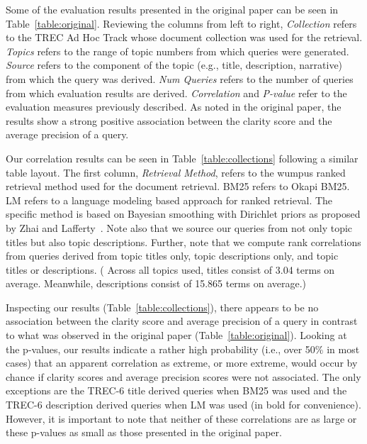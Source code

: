 \documentclass[format=sigconf, screen=true, review=false]{acmart}
\begin{document}
Some of the evaluation results presented in the original paper can be seen in Table~\ref{table:original}.
Reviewing the columns from left to right,
\textit{Collection} refers to the TREC Ad Hoc Track whose document collection was used for the retrieval.
\textit{Topics} refers to the range of topic numbers from which queries were generated.
\textit{Source} refers to the component of the topic (e.g., title, description, narrative) from which the query was derived.
\textit{Num Queries} refers to the number of queries from which evaluation results are derived.
\textit{Correlation} and \textit{P-value} refer to the evaluation measures previously described.
As noted in the original paper, the results show a strong positive association between the clarity score and the average precision of a query.



Our correlation results can be seen in Table~\ref{table:collections} following a similar table layout.
The first column, \textit{Retrieval Method}, refers to the wumpus ranked retrieval method used for the document retrieval.
BM25 refers to Okapi BM25.
LM refers to a language modeling based approach for ranked retrieval.
The specific method is based on Bayesian smoothing with Dirichlet priors as proposed by Zhai and Lafferty~\cite{10.1145/984321.984322}. Note also that we source our queries from not only topic titles but also topic descriptions.
Further, note that we compute rank correlations from queries derived from topic titles only, topic descriptions only, and topic titles or descriptions.
(%
Across all topics used, titles consist of 3.04 terms on average.
Meanwhile, descriptions consist of 15.865 terms on average.)


Inspecting our results (Table~\ref{table:collections}), there appears to be no association between the clarity score and average precision of a query in contrast to what was observed in the original paper (Table~\ref{table:original}).
Looking at the p-values, our results indicate a rather high probability (i.e., over 50\% in most cases) that an apparent correlation as extreme, or more extreme, would occur by chance if clarity scores and average precision scores were not associated.
The only exceptions are the TREC-6 title derived queries when BM25 was used and the TREC-6 description derived queries when LM was used (in bold for convenience).
However, it is important to note that neither of these correlations are as large or these p-values as small as those presented in the original paper.
\end{document}
